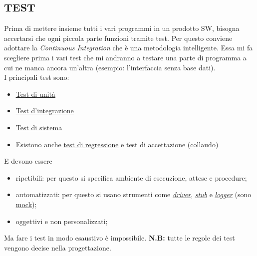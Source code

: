 		\subsection{TEST} 	\label{test}	%
		Prima di mettere insieme tutti i vari programmi in un prodotto SW, bisogna accertarsi che ogni piccola parte funzioni tramite test. %
		Per questo conviene adottare la \textit{Continuous Integration} che è una metodologia intelligente. Essa mi fa scegliere prima i vari test che mi andranno a testare una parte di programma a cui ne manca ancora un'altra (esempio: l'interfaccia senza base dati). \\
		I principali test sono:
		\begin{itemize}
			\item \underline{\hyperref[testunita]{Test di unità}}
			\item \underline{\hyperref[testintegrazione]{Test d'integrazione}}
			\item \underline{\hyperref[testsistema]{Test di sistema}}
			\item Esistono anche \underline{\hyperref[testregressione]{test di regressione}} e test di accettazione (collaudo)
		\end{itemize}
		E devono essere 
		\begin{itemize}
			\item ripetibili: per questo si specifica ambiente di esecuzione, attese e procedure;
			\item automatizzati: per questo si usano strumenti come \textit{\underline{\hyperref[driver]{driver}}}, \textit{\underline{\hyperref[stub]{stub}}} e \textit{\underline{\hyperref[logger]{logger}}} (sono \underline{\hyperref[mock]{mock}});
			\item oggettivi e non personalizzati;
		\end{itemize}
		Ma fare i test in modo esaustivo è impossibile.
		\textbf{N.B:} tutte le regole dei test vengono decise nella progettazione.
		

